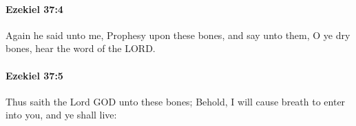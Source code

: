 		\paragraph{Ezekiel 37:4} %
			\label{EZEKIEL-37-4}

			Again he said unto me, Prophesy upon these bones, and say unto them, O ye dry bones, hear the word of the LORD.


		\paragraph{Ezekiel 37:5} %
			\label{EZEKIEL-37-5}

			Thus saith the Lord GOD unto these bones; Behold, I will cause breath to enter into you, and ye shall live:


